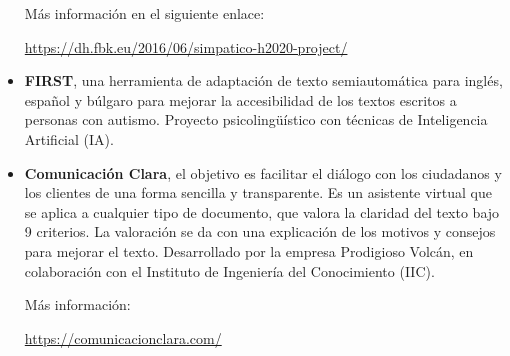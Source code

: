 \begin{itemize}
Más información en el siguiente enlace:


\href{https://dh.fbk.eu/2016/06/simpatico-h2020-project/}{https://dh.fbk.eu/2016/06/simpatico-h2020-project/}

\item
{\textbf{FIRST}}, una herramienta de adaptación de texto semiautomática para inglés, español y búlgaro para mejorar la accesibilidad de los textos escritos a personas con autismo. Proyecto psicolingüístico con técnicas de Inteligencia Artificial (IA).

\item
{\textbf{Comunicación Clara}}, el objetivo es facilitar el diálogo con los ciudadanos y los clientes de una forma sencilla y transparente. Es un asistente virtual que se aplica a cualquier tipo de documento, que valora la claridad del texto bajo 9 criterios. La valoración se da con una explicación de los motivos y consejos para mejorar el texto. Desarrollado por la empresa Prodigioso Volcán, en colaboración con el Instituto de Ingeniería del Conocimiento (IIC).

Más información:

\href{https://comunicacionclara.com/}{https://comunicacionclara.com/}



\end{itemize}








